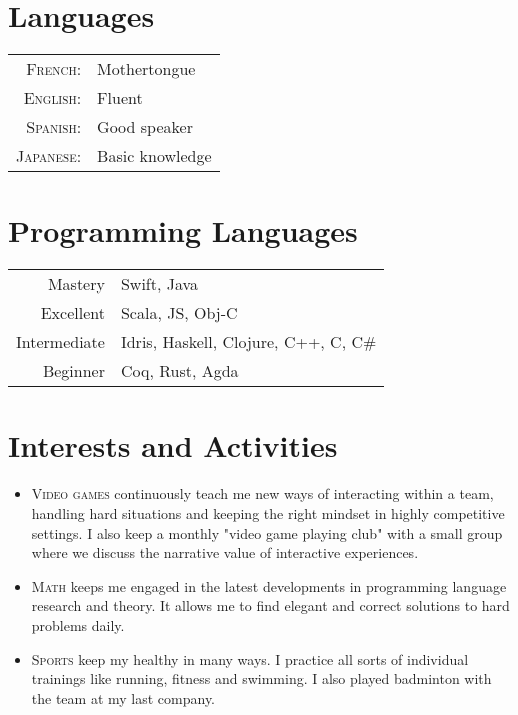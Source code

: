 \documentclass[a4paper,10pt]{article} %
\begin{document}

\section{Languages}

\begin{tabular}{rl}
\textsc{French:} & Mothertongue\\

\textsc{English:} & Fluent\\

\textsc{Spanish:} & Good speaker\\

\textsc{Japanese:} & Basic knowledge\\

\end{tabular}


\section{Programming Languages}

\begin{tabular}{r|l}
Mastery & Swift, Java\\
Excellent & Scala, JS, Obj-C\\
Intermediate & Idris, Haskell, Clojure, C++, C, C\#\\
Beginner & Coq, Rust, Agda\\
\end{tabular}

\section{Interests and Activities}
\begin{itemize}
	\item \textsc{Video games} continuously teach me new ways of interacting within a team, handling hard situations and keeping the right mindset in highly competitive settings. I also keep a monthly "video game playing club" with a small group where we discuss the narrative value of interactive experiences.
	\item \textsc{Math} keeps me engaged in the latest developments in programming language research and theory. It allows me to find elegant and correct solutions to hard problems daily.
	\item \textsc{Sports} keep my healthy in many ways. I practice all sorts of individual trainings like running, fitness and swimming. I also played badminton with the team at my last company.
\end{itemize}
\end{document}
